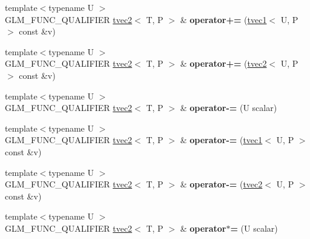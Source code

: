 \begin{DoxyCompactItemize}
\item 
\hypertarget{structglm_1_1tvec2_a977134a069d9e6fec28d33204ed68019}{{\footnotesize template$<$typename U $>$ }\\G\-L\-M\-\_\-\-F\-U\-N\-C\-\_\-\-Q\-U\-A\-L\-I\-F\-I\-E\-R \hyperlink{structglm_1_1tvec2}{tvec2}$<$ T, P $>$ \& {\bfseries operator+=} (\hyperlink{structglm_1_1tvec1}{tvec1}$<$ U, P $>$ const \&v)}\label{structglm_1_1tvec2_a977134a069d9e6fec28d33204ed68019}

\item 
\hypertarget{structglm_1_1tvec2_aa986a740e1ba345aa71814bb2a08e597}{{\footnotesize template$<$typename U $>$ }\\G\-L\-M\-\_\-\-F\-U\-N\-C\-\_\-\-Q\-U\-A\-L\-I\-F\-I\-E\-R \hyperlink{structglm_1_1tvec2}{tvec2}$<$ T, P $>$ \& {\bfseries operator+=} (\hyperlink{structglm_1_1tvec2}{tvec2}$<$ U, P $>$ const \&v)}\label{structglm_1_1tvec2_aa986a740e1ba345aa71814bb2a08e597}

\item 
\hypertarget{structglm_1_1tvec2_a11ccd30f5d8df13b15d2973eb4428a72}{{\footnotesize template$<$typename U $>$ }\\G\-L\-M\-\_\-\-F\-U\-N\-C\-\_\-\-Q\-U\-A\-L\-I\-F\-I\-E\-R \hyperlink{structglm_1_1tvec2}{tvec2}$<$ T, P $>$ \& {\bfseries operator-\/=} (U scalar)}\label{structglm_1_1tvec2_a11ccd30f5d8df13b15d2973eb4428a72}

\item 
\hypertarget{structglm_1_1tvec2_a9a7beb6222ef80a7f3cf2e9931182445}{{\footnotesize template$<$typename U $>$ }\\G\-L\-M\-\_\-\-F\-U\-N\-C\-\_\-\-Q\-U\-A\-L\-I\-F\-I\-E\-R \hyperlink{structglm_1_1tvec2}{tvec2}$<$ T, P $>$ \& {\bfseries operator-\/=} (\hyperlink{structglm_1_1tvec1}{tvec1}$<$ U, P $>$ const \&v)}\label{structglm_1_1tvec2_a9a7beb6222ef80a7f3cf2e9931182445}

\item 
\hypertarget{structglm_1_1tvec2_a77a58d01579458e0a09dcbd7a174592c}{{\footnotesize template$<$typename U $>$ }\\G\-L\-M\-\_\-\-F\-U\-N\-C\-\_\-\-Q\-U\-A\-L\-I\-F\-I\-E\-R \hyperlink{structglm_1_1tvec2}{tvec2}$<$ T, P $>$ \& {\bfseries operator-\/=} (\hyperlink{structglm_1_1tvec2}{tvec2}$<$ U, P $>$ const \&v)}\label{structglm_1_1tvec2_a77a58d01579458e0a09dcbd7a174592c}

\item 
\hypertarget{structglm_1_1tvec2_a189c3954227d5907491766fb117af513}{{\footnotesize template$<$typename U $>$ }\\G\-L\-M\-\_\-\-F\-U\-N\-C\-\_\-\-Q\-U\-A\-L\-I\-F\-I\-E\-R \hyperlink{structglm_1_1tvec2}{tvec2}$<$ T, P $>$ \& {\bfseries operator$\ast$=} (U scalar)}\label{structglm_1_1tvec2_a189c3954227d5907491766fb117af513}


\end{DoxyCompactItemize}
